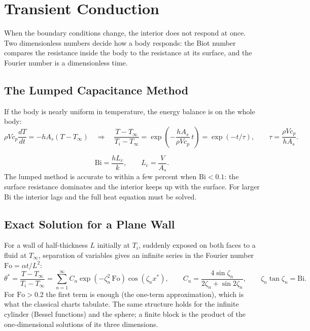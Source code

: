 \section*{Transient Conduction}

When the boundary conditions change, the interior does not respond at once. Two dimensionless numbers decide how a body responds: the Biot number compares the resistance inside the body to the resistance at its surface, and the Fourier number is a dimensionless time.

\subsection*{The Lumped Capacitance Method}

If the body is nearly uniform in temperature, the energy balance is on the whole body:
\[
\rho V c_p \frac{dT}{dt} = -hA_s (T - T_\infty)
\quad\Longrightarrow\quad
\frac{T - T_\infty}{T_i - T_\infty} = \exp\!\left(-\frac{hA_s}{\rho V c_p}\,t\right) = \exp(-t/\tau),
\qquad \tau = \frac{\rho V c_p}{hA_s}.
\]

\begin{definition}
\[
\mathrm{Bi} = \frac{h L_c}{k},\qquad L_c = \frac{V}{A_s}.
\]
The lumped method is accurate to within a few percent when $\mathrm{Bi} < 0.1$: the surface resistance dominates and the interior keeps up with the surface. For larger Bi the interior lags and the full heat equation must be solved.
\end{definition}

\subsection*{Exact Solution for a Plane Wall}

For a wall of half-thickness $L$ initially at $T_i$, suddenly exposed on both faces to a fluid at $T_\infty$, separation of variables gives an infinite series in the Fourier number $\mathrm{Fo} = \alpha t/L^2$:
\[
\theta^* = \frac{T - T_\infty}{T_i - T_\infty} = \sum_{n=1}^{\infty} C_n \exp(-\zeta_n^2\,\mathrm{Fo})\cos(\zeta_n x^*),
\qquad
C_n = \frac{4\sin\zeta_n}{2\zeta_n + \sin 2\zeta_n},
\qquad \zeta_n \tan\zeta_n = \mathrm{Bi}.
\]
For $\mathrm{Fo} > 0.2$ the first term is enough (the one-term approximation), which is what the classical charts tabulate. The same structure holds for the infinite cylinder (Bessel functions) and the sphere; a finite block is the product of the one-dimensional solutions of its three dimensions.


